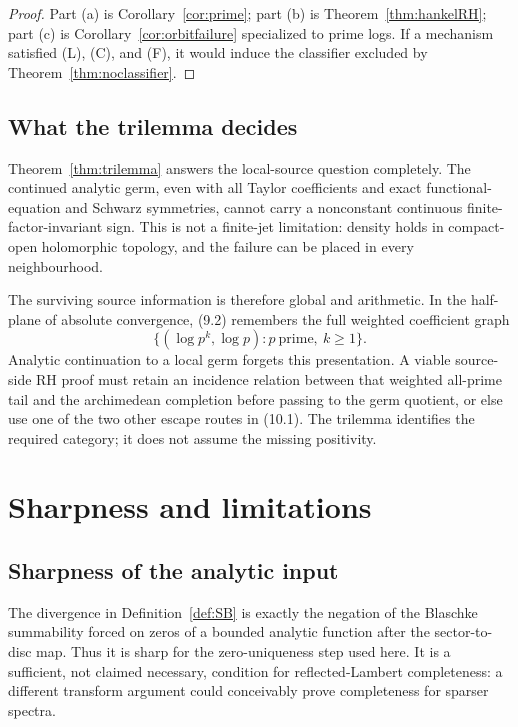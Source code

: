 \documentclass[11pt]{article}
\begin{document}
\begin{proof}
Part (a) is Corollary~\ref{cor:prime}; part (b) is
Theorem~\ref{thm:hankelRH}; part (c) is
Corollary~\ref{cor:orbitfailure} specialized to prime logs.  If a mechanism
satisfied (L), (C), and (F), it would induce the classifier excluded by
Theorem~\ref{thm:noclassifier}.
\end{proof}

\subsection{What the trilemma decides}

Theorem~\ref{thm:trilemma} answers the local-source question completely.  The
continued analytic germ, even with all Taylor coefficients and exact
functional-equation and Schwarz symmetries, cannot carry a nonconstant continuous
finite-factor-invariant sign.  This is not a finite-jet limitation: density holds in
compact-open holomorphic topology, and the failure can be placed in every
neighbourhood.

The surviving source information is therefore global and arithmetic.  In the
half-plane of absolute convergence, (9.2) remembers the full weighted coefficient
graph
\[
 \bigl\{(\log p^k,\log p):p\ \text{prime},\ k\geq1\bigr\}.
\tag{10.2}
\]
Analytic continuation to a local germ forgets this presentation.  A viable
source-side RH proof must retain an incidence relation between that weighted
all-prime tail and the archimedean completion before passing to the germ quotient,
or else use one of the two other escape routes in (10.1).  The trilemma identifies
the required category; it does not assume the missing positivity.

\section{Sharpness and limitations}

\subsection{Sharpness of the analytic input}

The divergence in Definition~\ref{def:SB} is exactly the negation of the Blaschke
summability forced on zeros of a bounded analytic function after the sector-to-disc
map.  Thus it is sharp for the zero-uniqueness step used here.  It is a sufficient,
not claimed necessary, condition for reflected-Lambert completeness: a different
transform argument could conceivably prove completeness for sparser spectra.
\end{document}
